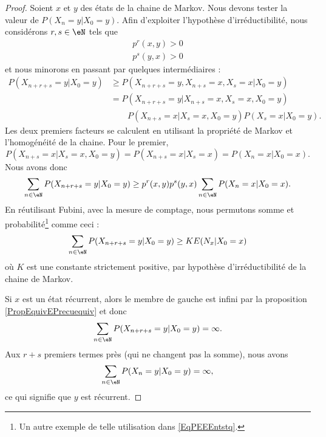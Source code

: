 \begin{proof}
	Soient \( x\) et \( y\) des états de la chaine de Markov. Nous devons tester la valeur de \( P(X_n=y|X_0=y)\). Afin d'exploiter l'hypothèse d'irréductibilité, nous considérons \( r,s\in\eN\) tels que
	\begin{subequations}
		\begin{align}
			p^r(x,y)>0 \\
			p^s(y,x)>0
		\end{align}
	\end{subequations}
	et nous minorons en passant par quelques intermédiaires :
	\begin{subequations}
		\begin{align}
			P(X_{n+r+s}=y|X_0=y) & \geq P(X_{n+r+s}=y,X_{n+s}=x,X_s=x|X_0=y)               \\
			                     & =P(X_{n+r+s}=y|X_{n+s}=x,X_s=x,X_0=y)                   \\
			                     & \qquad P(X_{n+s}=x|X_s=x,X_0=y)P(X_s=x|X_0=y)\nonumber.
		\end{align}
	\end{subequations}
	Les deux premiers facteurs se calculent en utilisant la propriété de Markov et l'homogénéité de la chaine. Pour le premier,
	\begin{equation}
		P(X_{n+s}=x|X_s=x,X_0=y)=P(X_{n+s}=x|X_s=x)=P(X_n=x|X_0=x).
	\end{equation}
	Nous avons donc
	\begin{equation}        \label{EqRmuXtG}
		\sum_{n\in\eN}P(X_{n+r+s}=y|X_0=y)\geq p^r(x,y)p^s(y,x)\sum_{n\in\eN}P(X_n=x|X_0=x).
	\end{equation}
	En réutilisant Fubini, avec la mesure de comptage, nous permutons somme et probabilité\footnote{Un autre exemple de telle utilisation dans \eqref{EqPEEEntstq}.} comme ceci :
	\begin{equation}
		\sum_{n\in \eN}P(X_{n+r+s}=y|X_0=y)\geq KE(N_x|X_0=x)
	\end{equation}
	où \( K\) est une constante strictement positive, par hypothèse d'irréductibilité de la chaine de Markov.

	Si \( x\) est un état récurrent, alors le membre de gauche est infini par la proposition \ref{PropEquivEPrecuequiv} et donc
	\begin{equation}
		\sum_{n\in\eN}P(X_{n+r+s}=y|X_0=y)=\infty.
	\end{equation}
	Aux \( r+s\) premiers termes près (qui ne changent pas la somme), nous avons
	\begin{equation}
		\sum_{n\in\eN}P(X_n=y|X_0=y)=\infty,
	\end{equation}
	ce qui signifie que \( y\) est récurrent.
\end{proof}

